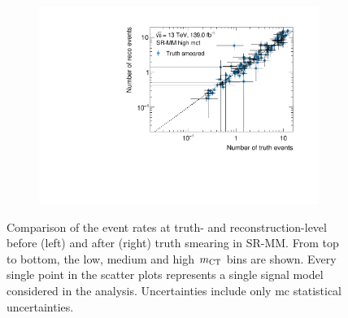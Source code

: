 \begin{figure}
\begin{subfigure}[b]{0.49\linewidth}
	\end{subfigure}\hfill
	\begin{subfigure}[b]{0.49\linewidth}
		\centering\includegraphics[width=\textwidth]{yields_SR-MM_high_mct_smeared}
	\end{subfigure}
	\caption{Comparison of the event rates at truth- and reconstruction-level before (left) and after (right) truth smearing in SR-MM. From top to bottom, the low, medium and high $m_{\textrm{CT}}$ bins are shown. Every single point in the scatter plots represents a single signal model considered in the \onelepton analysis. Uncertainties include only \gls{mc} statistical uncertainties.}
	\label{fig:smearing_signal_regions_2}
\end{figure}

